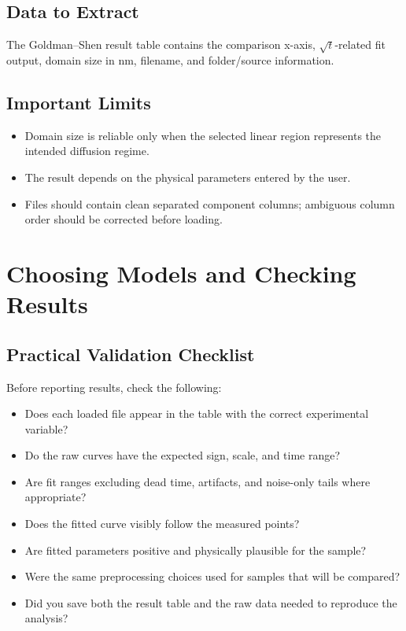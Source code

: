 \documentclass[11pt,a4paper]{article}
\begin{document}
\subsection{Data to Extract}
The Goldman--Shen result table contains the comparison x-axis, \(\sqrt{t}\)-related fit output, domain size in nm, filename, and folder/source information.

\subsection{Important Limits}
\begin{itemize}
  \item Domain size is reliable only when the selected linear region represents the intended diffusion regime.
  \item The result depends on the physical parameters entered by the user.
  \item Files should contain clean separated component columns; ambiguous column order should be corrected before loading.
\end{itemize}

\section{Choosing Models and Checking Results}

\subsection{Practical Validation Checklist}
Before reporting results, check the following:
\begin{itemize}
  \item Does each loaded file appear in the table with the correct experimental variable?
  \item Do the raw curves have the expected sign, scale, and time range?
  \item Are fit ranges excluding dead time, artifacts, and noise-only tails where appropriate?
  \item Does the fitted curve visibly follow the measured points?
  \item Are fitted parameters positive and physically plausible for the sample?
  \item Were the same preprocessing choices used for samples that will be compared?
  \item Did you save both the result table and the raw data needed to reproduce the analysis?
\end{itemize}
\end{document}
